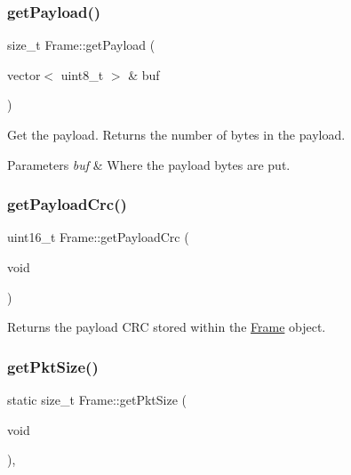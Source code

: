 \subsubsection{\texorpdfstring{get\+Payload()}{getPayload()}}
{\footnotesize\ttfamily size\+\_\+t Frame\+::get\+Payload (\begin{DoxyParamCaption}\item[{vector$<$ uint8\+\_\+t $>$ \&}]{buf }\end{DoxyParamCaption})\hspace{0.3cm}{\ttfamily [inline]}}

Get the payload. Returns the number of bytes in the payload. 
\begin{DoxyParams}{Parameters}
{\em buf} & Where the payload bytes are put. \\
\hline
\end{DoxyParams}
\mbox{\label{classFrame_ae3023171ac602d6be2ccb8e613c586c7}} 
\subsubsection{\texorpdfstring{get\+Payload\+Crc()}{getPayloadCrc()}}
{\footnotesize\ttfamily uint16\+\_\+t Frame\+::get\+Payload\+Crc (\begin{DoxyParamCaption}\item[{void}]{ }\end{DoxyParamCaption})\hspace{0.3cm}{\ttfamily [inline]}}

Returns the payload C\+RC stored within the \hyperlink{classFrame}{Frame} object. \mbox{\label{classFrame_ae72614ae975e9f856acd3b51dd65ecfc}} 
\subsubsection{\texorpdfstring{get\+Pkt\+Size()}{getPktSize()}}
{\footnotesize\ttfamily static size\+\_\+t Frame\+::get\+Pkt\+Size (\begin{DoxyParamCaption}\item[{void}]{ }\end{DoxyParamCaption})\hspace{0.3cm}{\ttfamily [inline]}, {\ttfamily [static]}}

